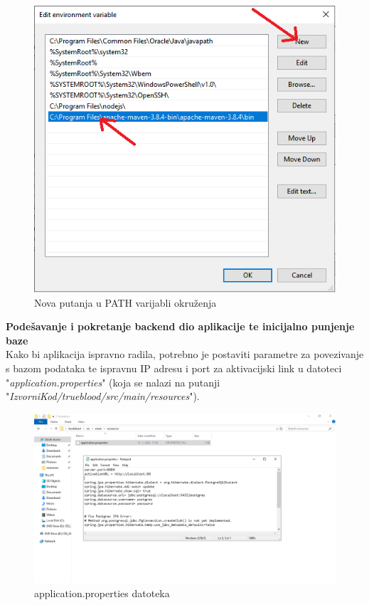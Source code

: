 			\begin{figure}[H]
			\centering
			\includegraphics[width=\textwidth, scale=0.5]{slike/newPathInsert}
			\caption{Nova putanja u PATH varijabli okruženja}
			\label{fig:newPathInsert}
			\end{figure}
			
			\textbf{Podešavanje i pokretanje backend dio aplikacije te inicijalno punjenje baze}\\
			Kako bi aplikacija ispravno radila, potrebno je postaviti parametre za povezivanje s bazom podataka te ispravnu IP adresu i port za aktivacijski link u datoteci "\textit{application.properties}" (koja se nalazi na putanji "\textit{IzvorniKod/trueblood/src/main/resources}").
			
			\begin{figure}[H]
			\centering
			\includegraphics[width=\textwidth, scale=0.5]{slike/ApplicationProperties}
			\caption{application.properties datoteka}
			\label{fig:ApplicationProperties}
			\end{figure}
			
